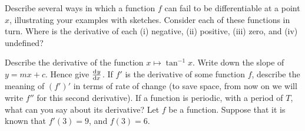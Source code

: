 \begin{questions}
\begin{multicols}{2}
    \end{multicols}
  \questioA Describe several ways in which a function $ f $ can fail to be differentiable at a point $ x $, illustrating your examples with sketches.
  \questioA Consider each of these functions in turn. Where is the derivative of each (i) negative, (ii) positive, (iii) zero, and (iv) undefined?
  \questioA Describe the derivative of the function $ x \mapsto \tan^{-1} x $.
  \questioA Write down the slope of $ y = mx + c $. Hence give $ \od{y}{x} $.
  \questioA If $ f' $ is the derivative of some function $ f $, describe the meaning of $ (f')' $ in terms of rate of change (to save space, from now on we
            will write $ f'' $ for this second derivative).
  \questioM If a function is periodic, with a period of $ T $, what can you say about its derivative?
  \questioA Let $ f $ be a function. Suppose that it is known that $ f'(3) = 9 $, and $ f(3) = 6 $.
\end{questions}
